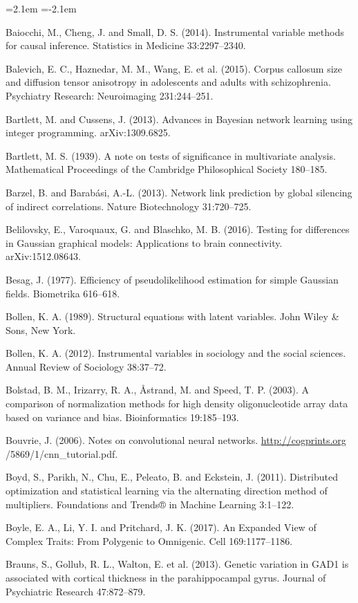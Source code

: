 \begin{list}{}{\leftmargin=2.1em  
  \itemindent=-2.1em \parsep=0pt \itemsep=2pt \topsep=0pt}
\item Baiocchi, M., Cheng, J. and Small, D. S. (2014). Instrumental variable methods for causal inference. Statistics in Medicine 33:2297--2340.
\item Balevich, E. C., Haznedar, M. M., Wang, E. et al. (2015). Corpus callosum size and diffusion tensor anisotropy in adolescents and adults with schizophrenia. Psychiatry Research: Neuroimaging 231:244--251.
\item Bartlett, M. and Cussens, J. (2013). Advances in Bayesian network learning using integer programming. arXiv:1309.6825.
\item Bartlett, M. S. (1939). A note on tests of significance in multivariate analysis. Mathematical Proceedings of the Cambridge Philosophical Society 180--185.
\item Barzel, B. and Barabási, A.-L. (2013). Network link prediction by global silencing of indirect correlations. Nature Biotechnology 31:720--725.
\item Belilovsky, E., Varoquaux, G. and Blaschko, M. B. (2016). Testing for differences in Gaussian graphical models: Applications to brain connectivity. arXiv:1512.08643.
\item Besag, J. (1977). Efficiency of pseudolikelihood estimation for simple Gaussian fields. Biometrika 616--618.
\item Bollen, K. A. (1989). Structural equations with latent variables. John Wiley \& Sons, New York.
\item Bollen, K. A. (2012). Instrumental variables in sociology and the social sciences. Annual Review of Sociology 38:37--72.
\item Bolstad, B. M., Irizarry, R. A., Åstrand, M. and Speed, T. P. (2003). A comparison of normalization methods for high density oligonucleotide array data based on variance and bias. Bioinformatics 19:185--193.
\item Bouvrie, J. (2006). Notes on convolutional neural networks. \url{http://cogprints.org} /5869/1/cnn\_tutorial.pdf.
\item Boyd, S., Parikh, N., Chu, E., Peleato, B. and Eckstein, J. (2011). Distributed optimization and statistical learning via the alternating direction method of multipliers. Foundations and Trends® in Machine Learning 3:1--122.
\item Boyle, E. A., Li, Y. I. and Pritchard, J. K. (2017). An Expanded View of Complex Traits: From Polygenic to Omnigenic. Cell 169:1177--1186.
\item Brauns, S., Gollub, R. L., Walton, E. et al. (2013). Genetic variation in GAD1 is associated with cortical thickness in the parahippocampal gyrus. Journal of Psychiatric Research 47:872--879.

\end{list}
